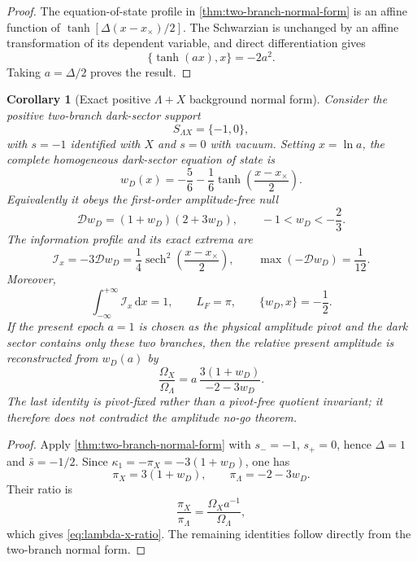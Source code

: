 \documentclass[aps,prd,reprint,onecolumn,nofootinbib,superscriptaddress,showkeys]{revtex4-2}
\numberwithin{equation}{section}
\theoremstyle{definition}
\theoremstyle{plain}
\newtheorem{corollary}{Corollary}[section]
\newcommand{\dd}{\mathrm d}
\newcommand{\Dil}{\mathscr D}
\begin{document}
\begin{proof}
The equation-of-state profile in \cref{thm:two-branch-normal-form} is an affine function of $\tanh[\Delta(x-x_\times)/2]$.  The Schwarzian is unchanged by an affine transformation of its dependent variable, and direct differentiation gives
\[
\{\tanh(ax),x\}=-2a^2.
\]
Taking $a=\Delta/2$ proves the result.
\end{proof}

\begin{corollary}[Exact positive $\Lambda+X$ background normal form]\label{cor:lambda-x-normal-form}
Consider the positive two-branch dark-sector support
\[
S_{\Lambda X}=\{-1,0\},
\]
with $s=-1$ identified with $X$ and $s=0$ with vacuum.  Setting $x=\ln a$, the complete homogeneous dark-sector equation of state is
\begin{equation}
\boxed{
w_D(x)=-\frac56-\frac16\tanh\!\left(\frac{x-x_\times}{2}\right).
}
\end{equation}
Equivalently it obeys the first-order amplitude-free null
\begin{equation}
\boxed{
\Dil w_D=(1+w_D)(2+3w_D),
\qquad -1<w_D<-\frac23.
}
\end{equation}
The information profile and its exact extrema are
\begin{equation}
\boxed{
\mathcal I_x=-3\Dil w_D
=\frac14\operatorname{sech}^2\!\left(\frac{x-x_\times}{2}\right),
\qquad
\max(-\Dil w_D)=\frac1{12}.
}
\end{equation}
Moreover,
\begin{equation}
\boxed{
\int_{-\infty}^{+\infty}\mathcal I_x\,\dd x=1,
\qquad
L_F=\pi,
\qquad
\{w_D,x\}=-\frac12.
}
\end{equation}
If the present epoch $a=1$ is chosen as the physical amplitude pivot and the dark sector contains only these two branches, then the relative present amplitude is reconstructed from $w_D(a)$ by
\begin{equation}
\boxed{
\frac{\Omega_X}{\Omega_\Lambda}
=a\,\frac{3(1+w_D)}{-2-3w_D}.
}
\label{eq:lambda-x-ratio}
\end{equation}
The last identity is pivot-fixed rather than a pivot-free quotient invariant; it therefore does not contradict the amplitude no-go theorem.
\end{corollary}

\begin{proof}
Apply \cref{thm:two-branch-normal-form} with $s_-=-1$, $s_+=0$, hence $\Delta=1$ and $\bar s=-1/2$.  Since $\kappa_1=-\pi_X=-3(1+w_D)$, one has
\[
\pi_X=3(1+w_D),
\qquad
\pi_\Lambda=-2-3w_D.
\]
Their ratio is
\[
\frac{\pi_X}{\pi_\Lambda}
=\frac{\Omega_Xa^{-1}}{\Omega_\Lambda},
\]
which gives \cref{eq:lambda-x-ratio}.  The remaining identities follow directly from the two-branch normal form.
\end{proof}
\end{document}
